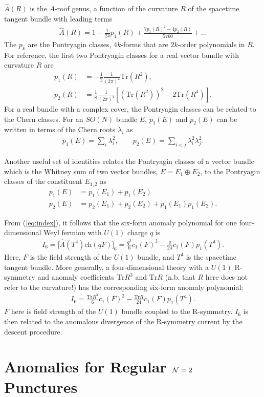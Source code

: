 \documentclass[a4paper,11pt]{article}
\newcommand{\ba}[1]{\begin{align} #1 \end{align} }
\def\tr{\text{Tr}}
\def\CN{{\cal N}}
\begin{document}
$\hat{A}(R)$ is the $A$-roof genus, a function of the curvature $R$ of the spacetime tangent bundle with leading terms
	\ba{
	\hat{A}(R) = 1-\frac{1}{24}p_1(R) + \frac{7p_1(R)^2-4p_2(R)}{5760} +\dots
	}
The $p_k$ are the Pontryagin classes, $4k$-forms that are $2k$-order polynomials in $R$. For reference, the first two Pontryagin classes for a real vector bundle with curvature $R$ are
	\ba{
	p_1(R) &= -\frac{1}{2} \frac{1}{(2\pi)^2} \tr (R^2),\\
	p_2(R) &= \frac{1}{8} \frac{1}{(2\pi)^4}\left[\left(\tr (R^2)\right)^2- 2\tr (R^4)\right].
	}
For a real bundle with a complex cover, the Pontryagin classes can be related to the Chern classes. For an $SO(N)$ bundle $E$, $p_1(E)$ and $p_2(E)$ can be written in terms of the Chern roots $\lambda_i$ as 	
	\ba{
	p_1(E)=\sum_i \lambda_i^2, \qquad p_2(E)=\sum_{i<j} \lambda_i^2\lambda_j^2.
	}
	

Another useful set of identities relates the Pontryagin classes of a vector bundle which is the Whitney sum of two vector bundles, $E=E_1\oplus E_2$, to the Pontryagin classes of the constituent $E_{1,2}$ as
	\ba{
	p_1(E) &= p_1(E_1) + p_1(E_2)\\
	p_2(E) &= p_2(E_1) + p_2(E_2) + p_1(E_1)p_1(E_2). \label{eq:pont}
	}

From (\ref{eq:index}), it follows that the six-form anomaly polynomial for one four-dimensional Weyl fermion with $U(1)$ charge $q$ is
	\ba{
	I_6 = \big[\hat{A}(T^4)\text{ch}(qF)\big]_6 = \frac{q^3}{6} c_1(F)^3 - \frac{q}{24} c_1(F) p_1(T^4).
	}
Here, $F$ is the field strength of the $U(1)$ bundle, and $T^4$ is the spacetime tangent bundle. More generally, a four-dimensional theory with a $U(1)$ R-symmetry and anomaly coefficients $\tr R^3$ and $\tr R$ (n.b. that $R$ here does not refer to the curvature!) has the corresponding six-form anomaly polynomial:
	\ba{
	I_6 = \frac{\tr R^3}{6} c_1(F)^3 - \frac{\tr R}{24}c_1(F) p_1(T^4). \label{eq:geni}
	}
$F$ here is field strength of the $U(1)$ bundle coupled to the R-symmetry. $I_6$ is then related to the anomalous divergence of the R-symmetry current by the descent procedure.



	
	
\section{Anomalies for Regular $\CN=2$ Punctures} \label{sec:punctures}
\end{document}
